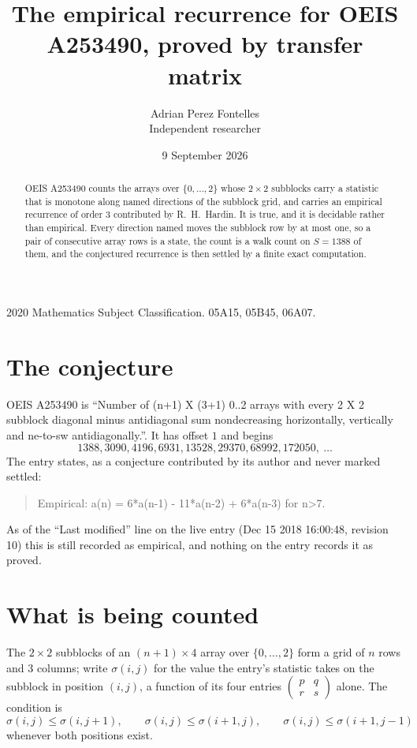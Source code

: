 \documentclass[11pt,a4paper]{article}
\title{The empirical recurrence for OEIS A253490, proved by transfer matrix}
\author{Adrian Perez Fontelles\\ \small Independent researcher}
\date{9 September 2026}
\theoremstyle{plain}
\theoremstyle{definition}
\begin{document}
\maketitle

\begin{abstract}
OEIS A253490 counts the arrays over $\{0,\dots,2\}$ whose $2\times2$ subblocks carry a
statistic that is monotone along named directions of the subblock grid, and carries an
empirical recurrence of order $3$ contributed by R.~H.~Hardin. It is true, and it is
decidable rather than empirical. Every direction named moves the subblock row by at most one,
so a pair of consecutive array rows is a state, the count is a walk count on $S=1388$ of them,
and the conjectured recurrence is then settled by a finite exact computation.
\end{abstract}

\noindent\small 2020 Mathematics Subject Classification. 05A15, 05B45, 06A07.\normalsize

\section{The conjecture}

OEIS A253490 is ``Number of (n+1) X (3+1) 0..2 arrays with every 2 X 2 subblock diagonal minus antidiagonal sum nondecreasing horizontally, vertically and ne-to-sw antidiagonally.''. It has offset $1$ and begins
\[
1388, 3090, 4196, 6931, 13528, 29370, 68992, 172050,\ \dots
\]
The entry states, as a conjecture contributed by its author and never marked settled:
\begin{quote}
Empirical: a(n) = 6*a(n-1) - 11*a(n-2) + 6*a(n-3) for n>7.
\end{quote}
As of the ``Last modified'' line on the live entry (Dec 15 2018 16:00:48, revision 10) this is still
recorded as empirical, and nothing on the entry records it as proved.

\section{What is being counted}

The $2\times2$ subblocks of an $(n+1)\times4$ array over $\{0,\dots,2\}$ form a grid
of $n$ rows and $3$ columns; write $\sigma(i,j)$ for the value the entry's statistic takes on
the subblock in position $(i,j)$, a function of its four entries
$\begin{pmatrix}p&q\\r&s\end{pmatrix}$ alone. The condition is
\[
\sigma(i,j)\le\sigma(i,j+1),\qquad \sigma(i,j)\le\sigma(i+1,j),\qquad \sigma(i,j)\le\sigma(i+1,j-1)
\]
whenever both positions exist.
\end{document}

